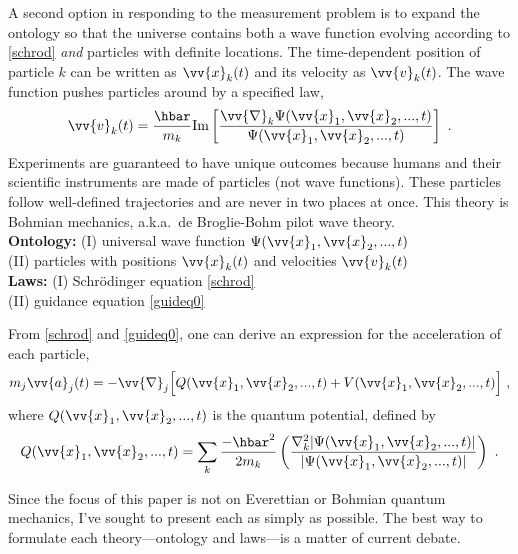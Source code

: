 \documentclass[12pt,secnumarabic,balancelastpage,amsmath,amssymb,nofootinbib]{article}
\begin{document}
A second option in responding to the measurement problem is to expand the ontology so that the universe contains both a wave function evolving according to \eqref{schrod} \emph{and} particles with definite locations.  The time-dependent position of particle $k$ can be written as $\vv{x}_k(t)$ and its velocity as $\vv{v}_k(t)$.  The wave function pushes particles around by a specified law,
\begin{equation}
\vv{v}_k(t)=\frac{\hbar}{m_k}\mbox{Im}\left[\frac{\vv{\nabla}_k\Psi(\vv{x}_1,\vv{x}_2,...,t)}{\Psi(\vv{x}_1,\vv{x}_2,...,t)}\right]\ .
\label{guideq0}
\end{equation}
Experiments are guaranteed to have unique outcomes because humans and their scientific instruments are made of particles (not wave functions).  These particles follow well-defined trajectories and are never in two places at once.  This theory is Bohmian mechanics, a.k.a.\ de Broglie-Bohm pilot wave theory.
\vspace*{6 pt}\\\hspace*{1.2cm}\textbf{Ontology:} (I) universal wave function $\Psi(\vv{x}_1,\vv{x}_2,...,t)$
\\\hspace*{1.2cm}(II) particles with positions $\vv{x}_k(t)$ and velocities $\vv{v}_k(t)$
\\\hspace*{1.2cm}\textbf{Laws:} (I) Schr\"{o}dinger equation \eqref{schrod}
\\\hspace*{1.2cm}(II) guidance equation \eqref{guideq0}\vspace*{6 pt}

From \eqref{schrod} and \eqref{guideq0}, one can derive an expression for the acceleration of each particle,
\begin{equation}
m_j \vv{a}_j(t)=-\vv{\nabla}_j\Big[Q(\vv{x}_1,\vv{x}_2,...,t)+V(\vv{x}_1,\vv{x}_2,...,t)\Big]\ ,
\label{oldeom}
\end{equation}
where $Q(\vv{x}_1,\vv{x}_2,...,t)$ is the quantum potential, defined by
\begin{equation}
Q(\vv{x}_1,\vv{x}_2,...,t)=\sum_k \frac{-\hbar^2}{2 m_k }\left(\frac{\nabla_k^2 |\Psi(\vv{x}_1,\vv{x}_2,...,t)|}{|\Psi(\vv{x}_1,\vv{x}_2,...,t)|}\right)\ .
\label{defofQ}
\end{equation}

Since the focus of this paper is not on Everettian or Bohmian quantum mechanics, I've sought to present each as simply as possible.  The best way to formulate each theory---ontology and laws---is a matter of current debate.
\end{document}
